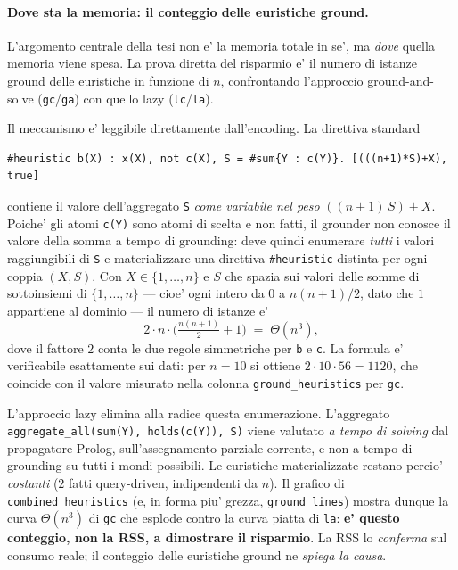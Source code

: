 \paragraph{Dove sta la memoria: il conteggio delle euristiche ground.}
L'argomento centrale della tesi non e' la memoria totale in se', ma \emph{dove}
quella memoria viene spesa. La prova diretta del risparmio e' il numero di
istanze ground delle euristiche in funzione di $n$, confrontando l'approccio
ground-and-solve (\texttt{gc}/\texttt{ga}) con quello lazy (\texttt{lc}/\texttt{la}).

Il meccanismo e' leggibile direttamente dall'encoding. La direttiva standard
\begin{verbatim}
#heuristic b(X) : x(X), not c(X), S = #sum{Y : c(Y)}. [(((n+1)*S)+X), true]
\end{verbatim}
contiene il valore dell'aggregato \texttt{S} \emph{come variabile nel peso}
$((n{+}1)\,S){+}X$. Poiche' gli atomi \texttt{c(Y)} sono atomi di scelta e non
fatti, il grounder non conosce il valore della somma a tempo di grounding:
deve quindi enumerare \emph{tutti} i valori raggiungibili di \texttt{S} e
materializzare una direttiva \texttt{\#heuristic} distinta per ogni coppia
$(X, S)$. Con $X \in \{1,\dots,n\}$ e $S$ che spazia sui valori delle
somme di sottoinsiemi di $\{1,\dots,n\}$ --- cioe' ogni intero da $0$ a
$n(n{+}1)/2$, dato che $1$ appartiene al dominio --- il numero di istanze e'
\[
2 \cdot n \cdot \Big(\tfrac{n(n+1)}{2} + 1\Big) \;=\; \Theta(n^3),
\]
dove il fattore $2$ conta le due regole simmetriche per \texttt{b} e \texttt{c}.
La formula e' verificabile esattamente sui dati: per $n=10$ si ottiene
$2 \cdot 10 \cdot 56 = 1120$, che coincide con il valore misurato nella colonna
\texttt{ground\_heuristics} per \texttt{gc}.

L'approccio lazy elimina alla radice questa enumerazione. L'aggregato
\texttt{aggregate\_all(sum(Y), holds(c(Y)), S)} viene valutato \emph{a tempo di
solving} dal propagatore Prolog, sull'assegnamento parziale corrente, e non a
tempo di grounding su tutti i mondi possibili. Le euristiche materializzate
restano percio' \emph{costanti} ($2$ fatti query-driven, indipendenti da $n$).
Il grafico di \texttt{combined\_heuristics} (e, in forma piu' grezza,
\texttt{ground\_lines}) mostra dunque la curva $\Theta(n^3)$ di \texttt{gc} che
esplode contro la curva piatta di \texttt{la}: \textbf{e' questo conteggio,
non la RSS, a dimostrare il risparmio}. La RSS lo \emph{conferma} sul consumo
reale; il conteggio delle euristiche ground ne \emph{spiega la causa}.


